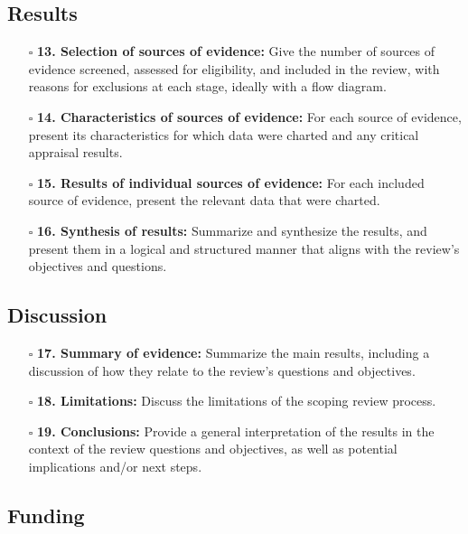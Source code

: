\documentclass[11pt]{article}
\def\tightlist{}
\begin{document}
\begin{Form}
\subsection{Results}\label{results}

\begin{itemize}
\tightlist
\item[$\square$]
  \textbf{13. Selection of sources of evidence:} Give the number of
  sources of evidence screened, assessed for eligibility, and included
  in the review, with reasons for exclusions at each stage, ideally with
  a flow diagram.
\item[$\square$]
  \textbf{14. Characteristics of sources of evidence:} For each source
  of evidence, present its characteristics for which data were charted
  and any critical appraisal results.
\item[$\square$]
  \textbf{15. Results of individual sources of evidence:} For each
  included source of evidence, present the relevant data that were
  charted.
\item[$\square$]
  \textbf{16. Synthesis of results:} Summarize and synthesize the
  results, and present them in a logical and structured manner that
  aligns with the review's objectives and questions.
\end{itemize}

\subsection{Discussion}\label{discussion}

\begin{itemize}
\tightlist
\item[$\square$]
  \textbf{17. Summary of evidence:} Summarize the main results,
  including a discussion of how they relate to the review's questions
  and objectives.
\item[$\square$]
  \textbf{18. Limitations:} Discuss the limitations of the scoping
  review process.
\item[$\square$]
  \textbf{19. Conclusions:} Provide a general interpretation of the
  results in the context of the review questions and objectives, as well
  as potential implications and/or next steps.
\end{itemize}

\subsection{Funding}\label{funding}


\end{Form}
\end{document}
